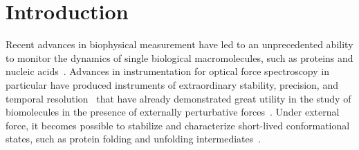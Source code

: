 \documentclass[aps,pre,twocolumn,superscriptaddress,nofootinbib,longbibliography]{revtex4-1}
\begin{document}
\maketitle

\small


\section{Introduction}
\label{section:introduction}

Recent advances in biophysical measurement have led to an unprecedented ability to monitor the dynamics of single biological macromolecules, such as proteins and nucleic acids~\cite{ritort:j-phys:2006:single-molecule-review}.
Advances in instrumentation for optical force spectroscopy in particular have produced instruments of extraordinary stability, precision, and temporal resolution~\cite{block:rev-sci-instrum:2004:optical-trapping,bustamante:annu-rev-biochem:2008:optical-tweezers} that have already demonstrated great utility in the study of biomolecules in the presence of externally perturbative forces~\cite{bustamante:nature:2003:dna-mechanics,block:curr-opin-chem-biol:2008:rna,bustamante:cell:2011:central-dogma}. 
Under external force, it becomes possible to stabilize and characterize short-lived conformational states, such as protein folding and unfolding intermediates~\cite{clarke:jmb:2002:titin-afm,cecconi-shank-bustamante-marqusee:science:2005:rnase-h,rief:pnas:2010:pmf}.
\end{document}
